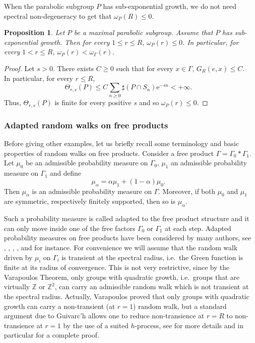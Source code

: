 \documentclass{amsart}
\newtheorem{prop}[thm]{Proposition}
\theoremstyle{definition}
\theoremstyle{remark}
\begin{document}
 When the parabolic subgroup $P$ has sub-exponential growth, we do not need spectral non-degeneracy to get that $\omega_P(R)\leq 0$.
 \begin{prop}\label{subexpgrowthparabolicgap}
 Let $P$ be a maximal parabolic subgroup.
Assume that $P$ has sub-exponential growth.
Then for every $1\leq r\leq R$, $\omega_P(r)\leq 0$.
In particular, for every $1<r\leq R$, $\omega_P(r)<\omega_\Gamma(r)$.
 \end{prop}
 
 \begin{proof}
 Let $s>0$.
There exists $C\geq 0$ such that for every $x\in \Gamma$, $G_R(e,x)\leq C$.
 In particular, for every $r\leq R$,
 $$\Theta_{r,s}(P)\leq C\sum_{n\geq 0}\sharp (P\cap S_n)\mathrm{e}^{-sn}<+\infty.$$
 Thus, $\Theta_{r,s}(P)$ is finite for every positive $s$ and so $\omega_P(r)\leq 0$.
 \end{proof}
 
 \subsubsection{Adapted random walks on free products}
Before giving other examples, let us briefly recall some terminology and basic properties of random walks on free products.
Consider a free product $\Gamma=\Gamma_0*\Gamma_1$.
Let $\mu_0$ be an admissible probability measure on $\Gamma_0$, $\mu_1$ an admissible probability measure on $\Gamma_1$ and define $$\mu_\alpha=\alpha \mu_1+(1-\alpha)\mu_0.$$
Then $\mu_\alpha$ is an admissible probability measure on $\Gamma$.
Moreover, if both $\mu_0$ and $\mu_1$ are symmetric, respectively finitely supported, then so is $\mu_\alpha$.

Such a probability measure is called adapted to the free product structure and it can only move inside one of the free factors $\Gamma_0$ or $\Gamma_1$ at each step.
Adapted probability measures on free products have been considered by many authors, see \cite{Cartwright1}, \cite{Cartwright2}, \cite{CandelleroGilch}, \cite{CandelleroGilchMuller}, \cite{WoessMartin} and \cite{WoessLLT} for instance.
For convenience we will assume that the random walk driven by $\mu_i$ on $\Gamma_i$ is transient at the spectral radius, i.e.\ the Green function is finite at its radius of convergence.
This is not very restrictive, since by the Varapoulos Theorem, only groups with quadratic growth, i.e.\ groups that are virtually $\mathbb{Z}$ or $\mathbb Z^2$, can carry an admissible random walk which is not transient at the spectral radius.
Actually, Varapoulos \cite{Varapoulos} proved that only groups with quadratic growth can carry a non-transient (at $r=1$) random walk, but a standard argument due to Guivarc'h \cite{Guivarch} allows one to reduce non-transience at $r=R$ to non-transience at $r=1$ by the use of a suited $h$-process, see \cite{Woessbook} for more details and in particular \cite[Theorem~7.8]{Woessbook} for a complete proof.
\end{document}
